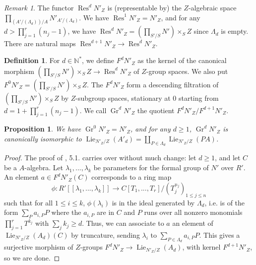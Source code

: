 \documentclass{article}
\newcommand{\N}{\mathbb{N}}
\DeclareMathOperator{\lie}{Lie}
\DeclareMathOperator{\gr}{Gr}
\DeclareMathOperator{\rest}{Res}
\newtheorem{prop}[thm]{Proposition}
\theoremstyle{definition}
\newtheorem{defi}[thm]{Definition}
\theoremstyle{remark}
\newtheorem{rem}{Remark}[thm]
\begin{document}
\begin{rem}
The functor $\rest^d N'_Z$ is (representable by) the $Z$-algebraic space $\prod\limits_{(A'/(\Lambda_d))/A} N'_{A'/(\Lambda_d)}$. We have $\rest^1 N'_Z=N'_Z$, and for any $d>\prod\limits_{j=1}^r (n_j-1)$, we have $\rest^d N'_Z=\left(\prod\limits_{S'/S}N'\right)\times_S Z$ since $\Lambda_d$ is empty. There are natural maps $\rest^{d+1} N'_Z\longrightarrow\rest^d N'_Z$.
\end{rem}

\begin{defi}\label{definition F^d N'}
For $d\in\N^*$, we define $F^d N'_Z$ as the kernel of the canonical morphism $\left(\prod\limits_{S'/S}N'\right)\times_S Z\longrightarrow\rest^d N'_Z$ of $Z$-group spaces. We also put $F^0 N'_Z=\left(\prod\limits_{S'/S}N'\right)\times_S Z$. The $F^d N'_Z$ form a descending filtration of $\left(\prod\limits_{S'/S}N'\right)\times_S Z$ by $Z$-subgroup spaces, stationary at $0$ starting from $d=1+\prod\limits_{j=1}^r (n_j-1)$. We call $\gr^d N'_Z$ the quotient $F^d N'_Z/F^{d+1} N'_Z$.
\end{defi}


\begin{prop}\label{proposition les quotients de F^d N' sont des algebres de Lie}
We have $\gr^0 N'_Z=N'_Z$, and for any $d\geq 1$, $\gr^d N'_Z$ is canonically isomorphic to $\lie_{N'_Z/Z}(A'_d)=\coprod\limits_{P\in\Lambda_d}\lie_{N'_Z/Z}(PA)$.
\end{prop}

\begin{proof}
The proof of \cite{TameRamification}, 5.1. carries over without much change: let $d\geq 1$, and let $C$ be a $A$-algebra. Let $\lambda_1,...,\lambda_k$ be parameters for the formal group of $N'$ over $R'$. An element $a\in F^d N'_Z(C)$ corresponds to a ring map
\[
\phi\colon R'[[\lambda_1,...,\lambda_k]]\longrightarrow C[T_1,...,T_r]/(T_j^{n_j})_{1\leq j\leq n}
\]
such that for all $1\leq i\leq k$, $\phi(\lambda_i)$ is in the ideal generated by $\Lambda_d$, i.e. is of the form $\sum\limits_{P} a_{i,P} P$ where the $a_{i,P}$ are in $C$ and $P$ runs over all nonzero monomials $\prod\limits_{j=1}^r T^{k_j}$ with $\sum\limits_j k_j\geq d$. Thus, we can associate to $a$ an element of $\lie_{N'_Z/Z}(A_d)(C)$ by truncature, sending $\lambda_i$ to $\sum\limits_{P\in\Lambda_d} a_{i,P} P$. This gives a surjective morphism of $Z$-groups $F^d N'_Z\longrightarrow\lie_{N'_Z/Z}(A_d)$, with kernel $F^{d+1}N'_Z$, so we are done.
\end{proof}
\end{document}
